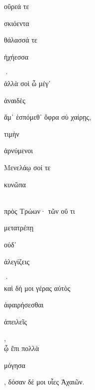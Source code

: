 \documentclass{ransom}
\begin{document}
\begin{foreignpage}
\begin{graytext}
οὔρεά τε \begin{whitetext}σκιόεντα\end{whitetext} θάλασσά τε \begin{whitetext}ἠχήεσσα\end{whitetext}·\\
ἀλλὰ σοὶ ὦ μέγ᾽ \begin{whitetext}ἀναιδὲς\end{whitetext} ἅμ᾽ ἑσπόμεθ᾽ ὄφρα σὺ χαίρῃς,\\
\begin{whitetext}τιμὴν\end{whitetext} \begin{whitetext}ἀρνύμενοι\end{whitetext} Μενελάῳ σοί τε \begin{whitetext}κυνῶπα\end{whitetext}\\
πρὸς Τρώων· τῶν οὔ τι \begin{whitetext}μετατρέπῃ\end{whitetext} οὐδ᾽ \begin{whitetext}ἀλεγίζεις\end{whitetext}·\hfill{}\\
καὶ δή μοι γέρας αὐτὸς \begin{whitetext}ἀφαιρήσεσθαι\end{whitetext} \begin{whitetext}ἀπειλεῖς\end{whitetext},\\
ᾧ ἔπι πολλὰ \begin{whitetext}μόγησα\end{whitetext}, δόσαν δέ μοι υἷες Ἀχαιῶν.\\

\end{graytext}


\end{foreignpage}
\end{document}
